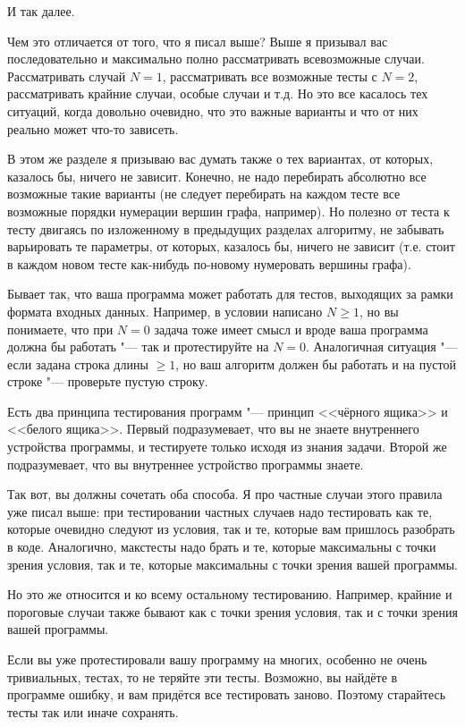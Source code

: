 И так далее.

Чем это отличается от того, что я писал выше? Выше я призывал вас последовательно и максимально полно рассматривать всевозможные случаи. 
Рассматривать случай $N=1$, рассматривать все возможные тесты с $N=2$, рассматривать крайние случаи, особые случаи и т.д. 
Но это все касалось тех ситуаций, когда довольно очевидно, что это важные варианты и что от них реально может что-то зависеть.

В этом же разделе я призываю вас думать также о тех вариантах, от которых, казалось бы, ничего не зависит. 
Конечно, не надо перебирать абсолютно все возможные такие варианты (не следует перебирать на каждом тесте все возможные порядки нумерации вершин графа, например). 
Но полезно от теста к тесту двигаясь по изложенному в предыдущих разделах алгоритму, не забывать варьировать те параметры, от которых, казалось бы,
ничего не зависит (т.е. стоит в каждом новом тесте как-нибудь по-новому нумеровать вершины графа).

Бывает так, что ваша программа может работать для тестов, выходящих за рамки формата входных данных.
Например, в условии написано $N\geq 1$, но вы понимаете, что при $N=0$ задача тоже имеет смысл и вроде ваша программа должна бы работать "---
так и протестируйте на $N=0$.  
Аналогичная ситуация "--- если задана строка длины $\geq 1$, но ваш алгоритм должен бы работать и на пустой строке "--- проверьте пустую строку.

 Есть два принципа тестирования программ "--- принцип <<чёрного ящика>> и <<белого ящика>>. 
Первый подразумевает, что вы не знаете внутреннего устройства программы, и тестируете только исходя из знания задачи. 
Второй же подразумевает, что вы внутреннее устройство программы знаете.

Так вот, вы должны сочетать оба способа. 
Я про частные случаи этого правила уже писал выше: при тестировании частных случаев надо тестировать как те, которые очевидно следуют из условия,
так и те, которые вам пришлось разобрать в коде.
Аналогично, макстесты надо брать и те, которые максимальны с точки зрения условия, так и те, которые максимальны с точки зрения вашей программы.

Но это же относится и ко всему остальному тестированию. 
Например, крайние и пороговые случаи также бывают как с точки зрения условия, так и с точки зрения вашей программы.

 Если вы уже протестировали вашу программу на многих, особенно не очень тривиальных, тестах, то не теряйте эти тесты. 
Возможно, вы найдёте в программе ошибку, и вам придётся все тестировать заново. Поэтому старайтесь тесты так или иначе сохранять.

